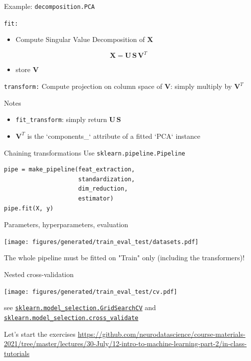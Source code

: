\documentclass[presentation,mathserif,table]{beamer}
\newcommand{\X}{{\mathbold X}}
\newcommand{\bS}{{\mathbold S}}
\newcommand{\U}{{\mathbold U}}
\newcommand{\V}{{\mathbold V}}
\begin{document}
\begin{frame}[label={sec:org8254bbf},fragile]{Example: \texttt{decomposition.PCA}}
 \begin{block}{\texttt{fit:}}
\begin{itemize}
\item Compute Singular Value Decomposition of \(\X\)
\end{itemize}
\begin{equation*}
\X = \U \, \bS \, \V^T
\end{equation*}
\begin{itemize}
\item store \(\V\)
\end{itemize}
\end{block}
\begin{block}{\texttt{transform:}}
Compute projection on column space of \(\V\): simply multiply by \(\V^T\)
\begin{block}{Notes}
\begin{itemize}
\item \texttt{fit\_transform}: simply return \(\U \, \bS\)
\item \(\V^T\) is the `components\_` attribute of a fitted `PCA` instance
\end{itemize}
\end{block}
\end{block}
\end{frame}
\begin{frame}[label={sec:org0762fdf},fragile]{Chaining transformations}
 Use \texttt{sklearn.pipeline.Pipeline}

\begin{verbatim}
pipe = make_pipeline(feat_extraction,
                     standardization,
                     dim_reduction,
                     estimator)
pipe.fit(X, y)
\end{verbatim}
\end{frame}
\begin{frame}[label={sec:org1122ffb}]{Parameters, hyperparameters, evaluation}
\begin{center}
\texttt{[image: figures/generated/train\_eval\_test/datasets.pdf]}
\end{center}
The whole pipeline must be fitted on "Train" only (including the transformers)!
\end{frame}
\begin{frame}[label={sec:orgf590811},fragile]{Nested cross-validation}
 \begin{center}
\texttt{[image: figures/generated/train\_eval\_test/cv.pdf]}
\end{center}
see  \href{https://scikit-learn.org/stable/modules/generated/sklearn.model\_selection.GridSearchCV.html}{\texttt{sklearn.model\_selection.GridSearchCV}}
and  \href{https://scikit-learn.org/stable/modules/generated/sklearn.model\_selection.GridSearchCV.html}{\texttt{sklearn.model\_selection.cross\_validate}}
\end{frame}
\begin{frame}[label={sec:org564edfb}]{Let's start the exercises}
\url{https://github.com/neurodatascience/course-materials-2021/tree/master/lectures/30-July/12-intro-to-machine-learning-part-2/in-class-tutorials}
\end{frame}
\end{document}

